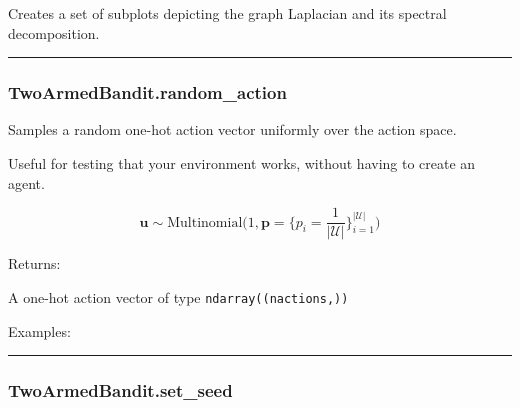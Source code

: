 Creates a set of subplots depicting the graph Laplacian and its spectral
decomposition.

\begin{center}\rule{0.5\linewidth}{\linethickness}\end{center}

\subsubsection{TwoArmedBandit.random\_action}\label{twoarmedbandit.random_action}

\begin{Shaded}
\begin{Highlighting}[]
\NormalTok{)}
\end{Highlighting}
\end{Shaded}

Samples a random one-hot action vector uniformly over the action space.

Useful for testing that your environment works, without having to create
an agent.

\[
\mathbf u \sim \mathrm{Multinomial}\Big(1, \mathbf p=\{p_i = \frac{1}{|\mathcal U|}\}_{i=1}^{|\mathcal U|}\Big)
\]

Returns:

A one-hot action vector of type \texttt{ndarray((nactions,))}

Examples:

\begin{Shaded}
\begin{Highlighting}[]
\OperatorTok{=}
\end{Highlighting}
\end{Shaded}

\begin{center}\rule{0.5\linewidth}{\linethickness}\end{center}

\subsubsection{TwoArmedBandit.set\_seed}\label{twoarmedbandit.set_seed}

\begin{Shaded}
\begin{Highlighting}[]
\OperatorTok{=}\NormalTok{)}
\end{Highlighting}
\end{Shaded}

